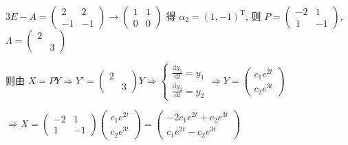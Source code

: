 \begin{enumerate}
                   \( 3E-A = \begin{pmatrix}
                       2  & 2  \\
                       -1 & -1
                   \end{pmatrix} \rightarrow \begin{pmatrix}
                       1 & 1 \\
                       0 & 0
                   \end{pmatrix} \) 得 \( \alpha_{2} = (1, -1)^{\mathrm{T}} \), 则 \( P = \begin{pmatrix}
                       -2 & 1  \\
                       1  & -1
                   \end{pmatrix} \), \( \Lambda = \begin{pmatrix}
                       2 &   \\
                         & 3
                   \end{pmatrix} \)

                   则由 \( X = P Y \Rightarrow Y' = \begin{pmatrix}
                       2 &   \\
                         & 3
                   \end{pmatrix} Y \Rightarrow \begin{cases}
                       \frac{\mathrm{d}y_{1}}{\mathrm{d}t} = y_{1} \\
                       \frac{\mathrm{d}y_{2}}{\mathrm{d}t} = y_{2}
                   \end{cases} \Rightarrow Y = \begin{pmatrix}
                       c_{1}e^{2t} \\
                       c_{2}e^{3t}
                   \end{pmatrix} \)

                   \( \Rightarrow X = \begin{pmatrix}
                       -2 & 1  \\
                       1  & -1
                   \end{pmatrix}\begin{pmatrix}
                       c_{1}e^{2t} \\
                       c_{2}e^{3t}
                   \end{pmatrix} = \begin{pmatrix}
                       -2c_{1}e^{2t} + c_{2}e^{3t} \\
                       c_{1}e^{2t} - c_{2}e^{3t}
                   \end{pmatrix} \)


\end{enumerate}
